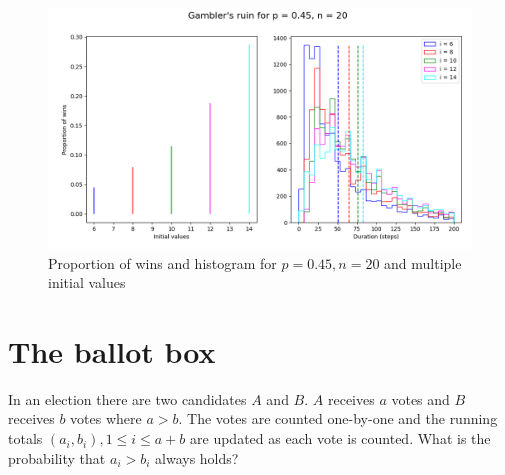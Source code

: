 \documentclass[11pt,a4paper]{article}
\begin{document}
\begin{figure}
\begin{center}
\includegraphics[width=\textwidth]{gamblers-ruin-02}
\caption{Proportion of wins and histogram for $p=0.45, n=20$ and multiple initial values}\label{f.gambler-hist2}
\end{center}
\end{figure}


\section{The ballot box}\label{s.ballot}

In an election there are two candidates $A$ and $B$.  $A$ receives $a$ votes and $B$ receives $b$ votes where $a>b$. The votes are counted one-by-one and the running totals $(a_i,b_i), 1\leq i \leq a+b$ are updated as each vote is counted. What is the probability that $a_i>b_i$ always holds?
\end{document}
